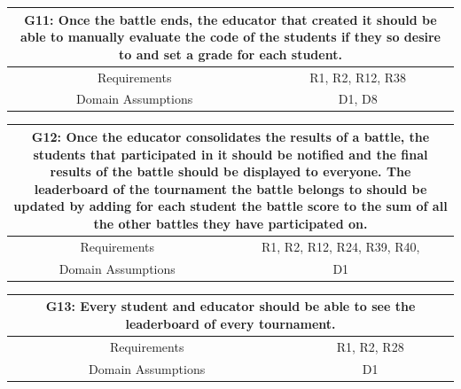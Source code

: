 \documentclass{article}
\begin{document}
\begin{table}[H]
    \centering
    \begin{tabular*}{\linewidth}{@{\extracolsep{\fill}} cc }
        \hline
        \multicolumn{2}{|c|}{\parbox{0.9\dimexpr\textwidth-2\tabcolsep\relax}{\centering\textbf{G11: Once the battle ends, the educator that created it should be able to manually evaluate the code of the students if they so desire to and set a grade for each student.}}} \\
        \hline
        Requirements & R1, R2, R12, R38\\
        \hline
        Domain Assumptions & D1, D8\\
        \hline
    \end{tabular*}
\end{table}

\begin{table}[H]
    \centering
    \begin{tabular*}{\linewidth}{@{\extracolsep{\fill}} cc }
        \hline
        \multicolumn{2}{|c|}{\parbox{0.9\dimexpr\textwidth-2\tabcolsep\relax}{\centering\textbf{G12: Once the educator consolidates the results of a battle, the students that participated in it should be notified and the final results of the battle should be displayed to everyone. The leaderboard of the tournament the battle belongs to should be updated by adding for each student the battle score to the sum of all the other battles they have participated on.
        }}} \\
        \hline
        Requirements & R1, R2, R12, R24, R39, R40, \\
        \hline
        Domain Assumptions & D1\\
        \hline
    \end{tabular*}
\end{table}

\begin{table}[htbp]
    \centering
    \begin{tabular*}{\linewidth}{@{\extracolsep{\fill}} cc }
        \hline
        \multicolumn{2}{|c|}{\parbox{0.9\dimexpr\textwidth-2\tabcolsep\relax}{\centering\textbf{G13: Every student and educator should be able to see the leaderboard of every tournament.}}} \\
        \hline
        Requirements & R1, R2, R28\\
        \hline
        Domain Assumptions & D1\\
        \hline
    \end{tabular*}
\end{table}
\end{document}
